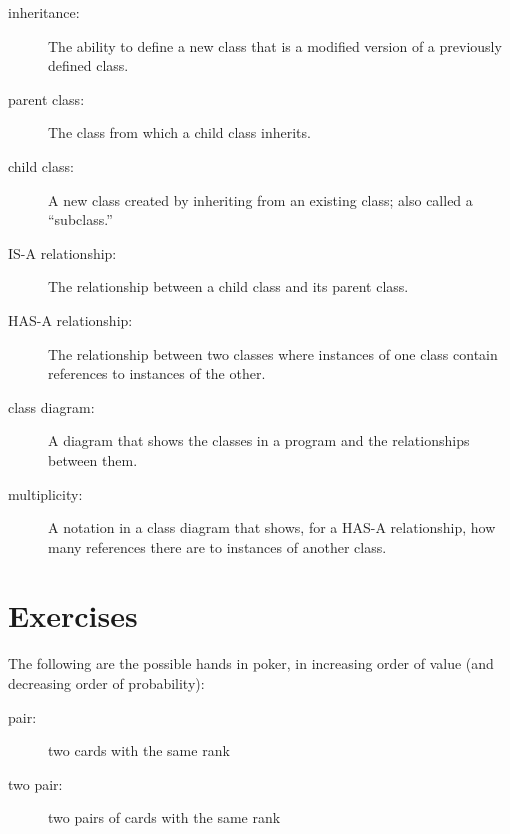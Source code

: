 \documentclass[10pt]{book}
\begin{document}
\begin{CJK}{UTF8}{gbsn}
\begin{description}
\item[inheritance:] The ability to define a new class that is a
modified version of a previously defined class.

\item[parent class:] The class from which a child class inherits.

\item[child class:] A new class created by inheriting from an
existing class; also called a ``subclass.''

\item[IS-A relationship:] The relationship between a child class
and its parent class.

\item[HAS-A relationship:] The relationship between two classes
where instances of one class contain references to instances of
the other.

\item[class diagram:] A diagram that shows the classes in a program
and the relationships between them.

\item[multiplicity:] A notation in a class diagram that shows, for
a HAS-A relationship, how many references there are to instances
of another class.

\end{description}


\section{Exercises}

\begin{exercise}
\label{poker}

The following are the possible hands in poker, in increasing order
of value (and decreasing order of probability):

\begin{description}

\item[pair:] two cards with the same rank
\vspace{-0.05in}

\item[two pair:] two pairs of cards with the same rank
\vspace{-0.05in}


\end{description}
\end{exercise}
\end{CJK}
\end{document}
